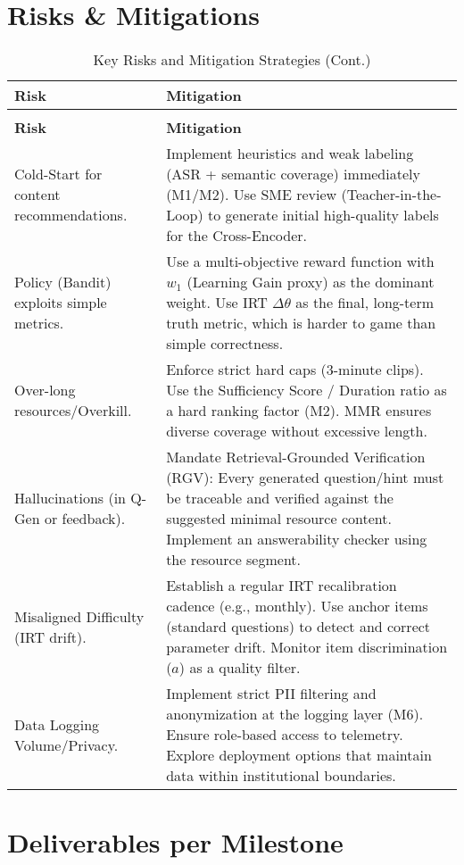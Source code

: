 \documentclass[12pt]{article}
\begin{document}
\begin{enumerate}
\section{Risks \& Mitigations}

\begin{longtable}{p{4.0cm}p{9.0cm}}
\caption{Key Risks and Mitigation Strategies} \\
\toprule
\textbf{Risk} & \textbf{Mitigation} \\
\midrule
\endfirsthead
\caption{Key Risks and Mitigation Strategies (Cont.)} \\
\toprule
\textbf{Risk} & \textbf{Mitigation} \\
\midrule
\endhead
\bottomrule
\endfoot
\endlastfoot

Cold-Start for content recommendations. & Implement heuristics and weak labeling (ASR + semantic coverage) immediately (M1/M2). Use SME review (Teacher-in-the-Loop) to generate initial high-quality labels for the Cross-Encoder. \\
Policy (Bandit) exploits simple metrics. & Use a multi-objective reward function with $w_1$ (Learning Gain proxy) as the dominant weight. Use IRT $\Delta\theta$ as the final, long-term truth metric, which is harder to game than simple correctness. \\
Over-long resources/Overkill. & Enforce strict hard caps (3-minute clips). Use the Sufficiency Score / Duration ratio as a hard ranking factor (M2). MMR ensures diverse coverage without excessive length. \\
Hallucinations (in Q-Gen or feedback). & Mandate Retrieval-Grounded Verification (RGV): Every generated question/hint must be traceable and verified against the suggested minimal resource content. Implement an answerability checker using the resource segment. \\
Misaligned Difficulty (IRT drift). & Establish a regular IRT recalibration cadence (e.g., monthly). Use anchor items (standard questions) to detect and correct parameter drift. Monitor item discrimination ($a$) as a quality filter. \\
Data Logging Volume/Privacy. & Implement strict PII filtering and anonymization at the logging layer (M6). Ensure role-based access to telemetry. Explore deployment options that maintain data within institutional boundaries. \\
\end{longtable}

\section{Deliverables per Milestone}


\end{enumerate}
\end{document}
